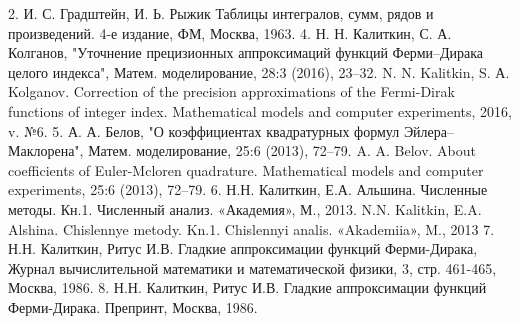 2. И. С. Градштейн, И. Ь. Рыжик Таблицы интегралов, сумм, рядов и произведений. 4-е издание, ФМ,
Москва, 1963.
4. Н. Н. Калиткин, С. А. Колганов, "Уточнение прецизионных аппроксимаций функций Ферми–Дирака
целого индекса", Матем. моделирование, 28:3 (2016), 23–32.
N. N. Kalitkin, S. А. Kolganov. Correction of the precision approximations of the Fermi-Dirak functions of
integer index. Mathematical models and computer experiments, 2016, v. №6.
5. А. А. Белов, "О коэффициентах квадратурных формул Эйлера–Маклорена", Матем. моделирование, 25:6
(2013), 72–79.
A. A. Belov. About coefficients of Euler-Mcloren quadrature. Mathematical models and computer experiments,
25:6 (2013), 72–79.
6. Н.Н. Калиткин, Е.А. Альшина. Численные методы. Кн.1. Численный анализ. «Академия», М., 2013.
N.N. Kalitkin, E.A. Alshina. Chislennye metody. Kn.1. Chislennyi analis. «Akademiia», M., 2013
7. Н.Н. Калиткин, Ритус И.В. Гладкие аппроксимации функций Ферми-Дирака, Журнал вычислительной
математики и математической физики, 3, стр. 461-465, Москва, 1986.
8. Н.Н. Калиткин, Ритус И.В. Гладкие аппроксимации функций Ферми-Дирака. Препринт, Москва, 1986.